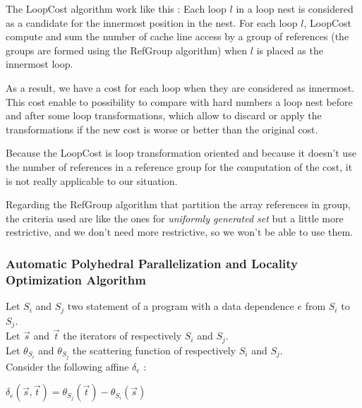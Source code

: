 \documentclass[paper=a4, fontsize=11pt]{scrartcl}
\numberwithin{equation}{section}        %
\numberwithin{figure}{section}          %
\numberwithin{table}{section}               %
\begin{document}
            The LoopCost algorithm work like this : 
            Each loop $l$ in a loop nest is considered as a candidate for the innermost
            position in the nest. For each loop $l$, LoopCost compute and sum the number
            of cache line access by a group of references (the groups are formed
            using the RefGroup algorithm) when $l$ is placed as the innermost loop.

            As a result, we have a cost for each loop when they are considered as innermost.
            This cost enable to possibility to compare with hard numbers
            a loop nest before and after some loop transformations, which allow to discard
            or apply the transformations if the new cost is worse or better than the
            original cost.
            \bigskip

            Because the LoopCost is loop transformation oriented and because it doesn't
            use the number of references in a reference group for the computation
            of the cost, it is not really applicable to our situation.

            Regarding the RefGroup algorithm that partition the array references
            in group, the criteria used are like the ones for \textit{uniformly generated set}
            but a little more restrictive, and we don't need more restrictive, so we won't
            be able to use them.
            
            
        \subsubsection{Automatic Polyhedral Parallelization and Locality Optimization Algorithm}
        \label{sec:auto_poly_paral}
            Let $S_i$ and $S_j$ two statement of a program with a data dependence $e$
            from $S_i$ to $S_j$.\\
            Let $\vec{s}$ and $\vec{t}$ the iterators of respectively $S_i$ and $S_j$.\\
            Let $\theta_{S_i}$ and $\theta_{S_j}$ the scattering function of respectively $S_i$
            and $S_j$.\\
            Consider the following affine $\delta_e$ :
            \begin{center}
                $\delta_e\left(\vec{s},\vec{t}\right) = \theta_{S_j}\left(\vec{t}\right) - \theta_{S_i}\left(\vec{s}\right)$
            \end{center}
\end{document}
